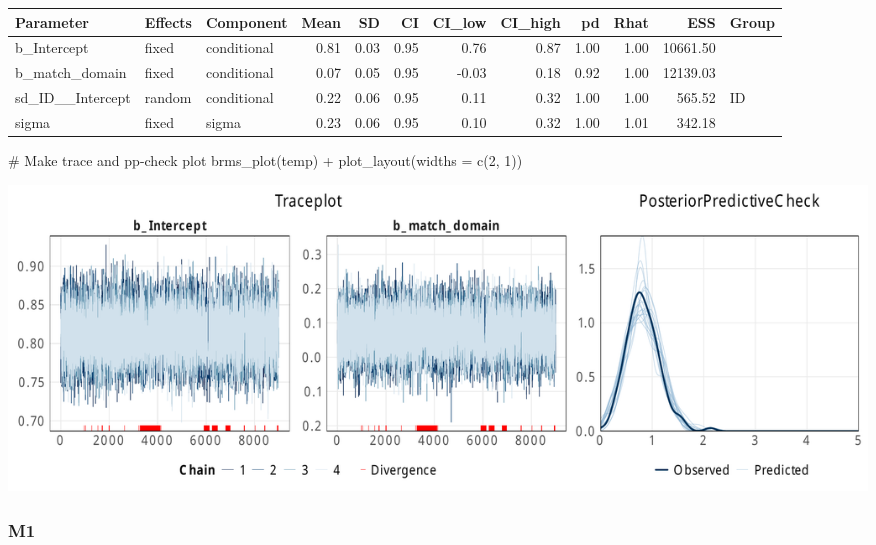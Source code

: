 \documentclass[
  letterpaper,
  DIV=11,
  numbers=noendperiod]{scrartcl}
\newenvironment{Shaded}{\begin{snugshade}}{\end{snugshade}}
\newcommand{\AttributeTok}[1]{\textcolor[rgb]{0.40,0.45,0.13}{#1}}
\newcommand{\CommentTok}[1]{\textcolor[rgb]{0.37,0.37,0.37}{#1}}
\newcommand{\DecValTok}[1]{\textcolor[rgb]{0.68,0.00,0.00}{#1}}
\newcommand{\FunctionTok}[1]{\textcolor[rgb]{0.28,0.35,0.67}{#1}}
\newcommand{\NormalTok}[1]{\textcolor[rgb]{0.00,0.23,0.31}{#1}}
\newcommand{\OtherTok}[1]{\textcolor[rgb]{0.00,0.23,0.31}{#1}}
\newcommand{\SpecialCharTok}[1]{\textcolor[rgb]{0.37,0.37,0.37}{#1}}
\newcommand{\StringTok}[1]{\textcolor[rgb]{0.13,0.47,0.30}{#1}}
\begin{document}
\begin{longtable*}[t]{lllrrrrrrrrl}
\toprule
Parameter & Effects & Component & Mean & SD & CI & CI\_low & CI\_high & pd & Rhat & ESS & Group\\
\midrule
b\_Intercept & fixed & conditional & 0.81 & 0.03 & 0.95 & 0.76 & 0.87 & 1.00 & 1.00 & 10661.50 & \\
b\_match\_domain & fixed & conditional & 0.07 & 0.05 & 0.95 & -0.03 & 0.18 & 0.92 & 1.00 & 12139.03 & \\
sd\_ID\_\_Intercept & random & conditional & 0.22 & 0.06 & 0.95 & 0.11 & 0.32 & 1.00 & 1.00 & 565.52 & ID\\
sigma & fixed & sigma & 0.23 & 0.06 & 0.95 & 0.10 & 0.32 & 1.00 & 1.01 & 342.18 & \\
\bottomrule
\end{longtable*}

\begin{Shaded}
\begin{Highlighting}[]
\CommentTok{\# Make trace and pp{-}check plot}
\FunctionTok{brms\_plot}\NormalTok{(temp) }\SpecialCharTok{+} \FunctionTok{plot\_layout}\NormalTok{(}\AttributeTok{widths =} \FunctionTok{c}\NormalTok{(}\DecValTok{2}\NormalTok{, }\DecValTok{1}\NormalTok{))}
\end{Highlighting}
\end{Shaded}

\includegraphics{supplement_files/figure-pdf/h3bM0-1.pdf}

\subsubsection{M1}\label{m1-1}

\begin{Shaded}
\end{Shaded}
\end{document}
